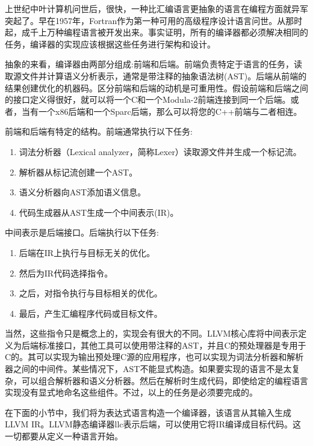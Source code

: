 上世纪中叶计算机问世后，很快，一种比汇编语言更抽象的语言在编程方面就异军突起了。早在1957年，Fortran作为第一种可用的高级程序设计语言问世。从那时起，成千上万种编程语言被开发出来。事实证明，所有的编译器都必须解决相同的任务，编译器的实现应该根据这些任务进行架构和设计。\par

抽象的来看，编译器由两部分组成:前端和后端。前端负责特定于语言的任务，读取源文件并计算语义分析表示，通常是带注释的抽象语法树(AST)。后端从前端的结果创建优化的机器码。区分前端和后端的动机是可重用性。假设前端和后端之间的接口定义得很好，就可以将一个C和一个Modula-2前端连接到同一个后端。或者，当有一个x86后端和一个Sparc后端，那么可以将您的C++前端与二者相连。\par

前端和后端有特定的结构。前端通常执行以下任务:\par

\begin{enumerate}
\item 词法分析器（Lexical analyzer，简称Lexer）读取源文件并生成一个标记流。
\item 解析器从标记流创建一个AST。
\item 语义分析器向AST添加语义信息。
\item 代码生成器从AST生成一个中间表示(IR)。
\end{enumerate}

中间表示是后端接口。后端执行以下任务:\par

\begin{enumerate}
\item 后端在IR上执行与目标无关的优化。
\item 然后为IR代码选择指令。
\item 之后，对指令执行与目标相关的优化。
\item 最后，产生汇编程序代码或目标文件。
\end{enumerate}

当然，这些指令只是概念上的，实现会有很大的不同。LLVM核心库将中间表示定义为后端标准接口，其他工具可以使用带注释的AST，并且C的预处理器是专用于C的。其可以实现为输出预处理C源的应用程序，也可以实现为词法分析器和解析器之间的中间件。某些情况下，AST不能显式构造。如果要实现的语言不是太复杂，可以组合解析器和语义分析器。然后在解析时生成代码，即使给定的编程语言实现没有显式地命名这些组件。不过，以上的任务是必须要完成的。\par

在下面的小节中，我们将为表达式语言构造一个编译器，该语言从其输入生成LLVM IR。LLVM静态编译器llc表示后端，可以使用它将IR编译成目标代码。这一切都要从定义一种语言开始。\par






















